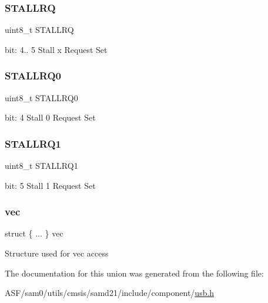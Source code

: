 \subsubsection{\texorpdfstring{STALLRQ}{STALLRQ}}
{\footnotesize\ttfamily uint8\+\_\+t S\+T\+A\+L\+L\+RQ}

bit\+: 4.. 5 Stall x Request Set \mbox{\label{union_u_s_b___d_e_v_i_c_e___e_p_s_t_a_t_u_s_s_e_t___type_a1b62d73ab84a16453cfe76dbae8e652c}} 
\subsubsection{\texorpdfstring{STALLRQ0}{STALLRQ0}}
{\footnotesize\ttfamily uint8\+\_\+t S\+T\+A\+L\+L\+R\+Q0}

bit\+: 4 Stall 0 Request Set \mbox{\label{union_u_s_b___d_e_v_i_c_e___e_p_s_t_a_t_u_s_s_e_t___type_aff69880ca0480a1518048272fd4b415c}} 
\subsubsection{\texorpdfstring{STALLRQ1}{STALLRQ1}}
{\footnotesize\ttfamily uint8\+\_\+t S\+T\+A\+L\+L\+R\+Q1}

bit\+: 5 Stall 1 Request Set \mbox{\label{union_u_s_b___d_e_v_i_c_e___e_p_s_t_a_t_u_s_s_e_t___type_abb8a1621d0319975d3302aa2daf5dee7}} 
\subsubsection{\texorpdfstring{vec}{vec}}
{\footnotesize\ttfamily struct \{ ... \}   vec}

Structure used for vec access 

The documentation for this union was generated from the following file\+:\begin{DoxyCompactItemize}
\item 
A\+S\+F/sam0/utils/cmsis/samd21/include/component/\mbox{\hyperlink{component_2usb_8h}{usb.\+h}}\end{DoxyCompactItemize}
